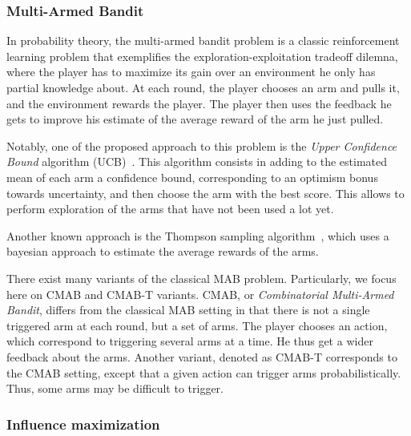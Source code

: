 \documentclass[a4paper,12pt]{article}
\begin{document}
\subsubsection{Multi-Armed Bandit}

In probability theory, the multi-armed bandit problem is a classic reinforcement learning problem that exemplifies the exploration-exploitation tradeoff dilemna, where the player has to maximize its gain over an environment he only has partial knowledge about. At each round, the player chooses an arm and pulls it, and the environment rewards the player. The player then uses the feedback he gets to improve his estimate of the average reward of the arm he just pulled.

Notably, one of the proposed approach to this problem is the \emph{Upper Confidence Bound} algorithm (UCB)~\cite{li2010contextual}. This algorithm consists in adding to the estimated mean of each arm a confidence bound, corresponding to an optimism bonus towards uncertainty, and then choose the arm with the best score. This allows to perform exploration of the arms that have not been used a lot yet.

Another known approach is the Thompson sampling algorithm~\cite{thompson1933likelihood}, which uses a bayesian approach to estimate the average rewards of the arms.

There exist many variants of the classical MAB problem. Particularly, we focus here on CMAB and CMAB-T variants. CMAB, or \emph{Combinatorial Multi-Armed Bandit}, differs from the classical MAB setting in that there is not a single triggered arm at each round, but a set of arms. The player chooses an action, which correspond to triggering several arms at a time. He thus get a wider feedback about the arms. Another variant, denoted as CMAB-T corresponds to the CMAB setting, except that a given action can trigger arms probabilistically. Thus, some arms may be difficult to trigger.


\subsubsection{Influence maximization}
\end{document}
